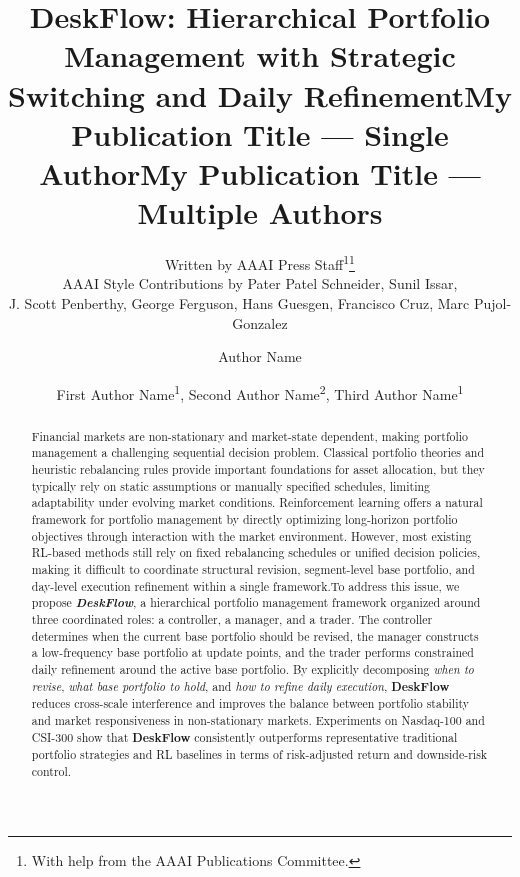 \documentclass[letterpaper]{article} %
\title{\textbf{DeskFlow}: Hierarchical Portfolio Management with Strategic Switching and Daily Refinement}
\author{
    Written by AAAI Press Staff\textsuperscript{\rm 1}\thanks{With help from the AAAI Publications Committee.}\\
    AAAI Style Contributions by Pater Patel Schneider,
    Sunil Issar,\\
    J. Scott Penberthy,
    George Ferguson,
    Hans Guesgen,
    Francisco Cruz\equalcontrib,
    Marc Pujol-Gonzalez\equalcontrib
}
\title{My Publication Title --- Single Author}
\author {
    Author Name
}
\title{My Publication Title --- Multiple Authors}
\author {
    First Author Name\textsuperscript{\rm 1},
    Second Author Name\textsuperscript{\rm 2},
    Third Author Name\textsuperscript{\rm 1}
}
\begin{document}
\maketitle

\begin{abstract}
Financial markets are non-stationary and market-state dependent, making portfolio management a challenging sequential decision problem. Classical portfolio theories and heuristic rebalancing rules provide important foundations for asset allocation, but they typically rely on static assumptions or manually specified schedules, limiting adaptability under evolving market conditions. Reinforcement learning offers a natural framework for portfolio management by directly optimizing long-horizon portfolio objectives through interaction with the market environment. However, most existing RL-based methods still rely on fixed rebalancing schedules or unified decision policies, making it difficult to coordinate structural revision, segment-level base portfolio, and day-level execution refinement within a single framework.To address this issue, we propose \textit{\textbf{DeskFlow}}, a hierarchical portfolio management framework organized around three coordinated roles: a controller, a manager, and a trader. The controller determines when the current base portfolio should be revised, the manager constructs a low-frequency base portfolio at update points, and the trader performs constrained daily refinement around the active base portfolio. By explicitly decomposing \emph{when to revise}, \emph{what base portfolio to hold}, and \emph{how to refine daily execution}, \textbf{DeskFlow} reduces cross-scale interference and improves the balance between portfolio stability and market responsiveness in non-stationary markets. Experiments on Nasdaq-100 and CSI-300 show that \textbf{DeskFlow} consistently outperforms representative traditional portfolio strategies and RL baselines in terms of risk-adjusted return and downside-risk control.
\end{abstract}

\end{document}
